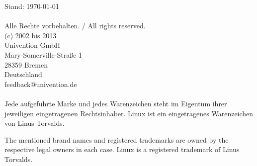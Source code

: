 
\begin{titlepage}
  \thispagestyle{empty}


  \vspace*{3cm}
  \sffamily \bfseries
  \begin{center}
    \Huge
    \huge
  \end{center}
  \normalsize
  \normalfont

\newpage
\AddToShipoutPicture{\ifthenelse{\isodd{\thepage}}%
	{\BackgroundPicOdd}{\BackgroundPicEven}}
\thispagestyle{empty}
\parindent0cm
\sffamily
\vspace*{11cm}

Stand: \today \\
\\
Alle Rechte vorbehalten. / All rights reserved.\\
(c) 2002 bis 2013 \\
Univention GmbH \\
Mary-Somerville-Straße 1 \\
28359 Bremen \\
Deutschland \\
feedback@univention.de \\
\\
Jede aufgeführte Marke und jedes Warenzeichen steht im Eigentum ihrer
jeweiligen eingetragenen Rechtsinhaber. Linux ist ein eingetragenes
Warenzeichen von Linus Torvalds.

The mentioned brand names and registered trademarks are owned by the
respective legal owners in each case. Linux is a registered trademark
of Linus Torvalds.

\end{titlepage}


\dominitoc
\tableofcontents
\newpage

